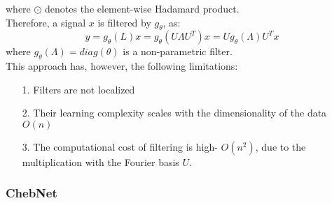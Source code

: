 where $\odot$ denotes the element-wise Hadamard product.\\
Therefore, a signal $x$ is filtered by $g_{\theta}$, as:\\
\begin{equation}
y = g_{\theta}(L)x = g_{\theta} (U\Lambda U^T)x = U g_{\theta}(\Lambda ) U^T x
\end{equation}
where $g_{\theta}(\Lambda) = diag(\theta)$ is a non-parametric filter.\\
This approach has, however, the following limitations:
\begin{itemize}
\item [1.] Filters are not localized
\item [2.] Their learning complexity scales with the dimensionality of the data $O(n)$
\item [3.] The computational cost of filtering is high- $O(n^2)$, due to the
multiplication with the Fourier basis $U$.
\end{itemize}

\subsubsection*{ChebNet\cite{defferard}}
